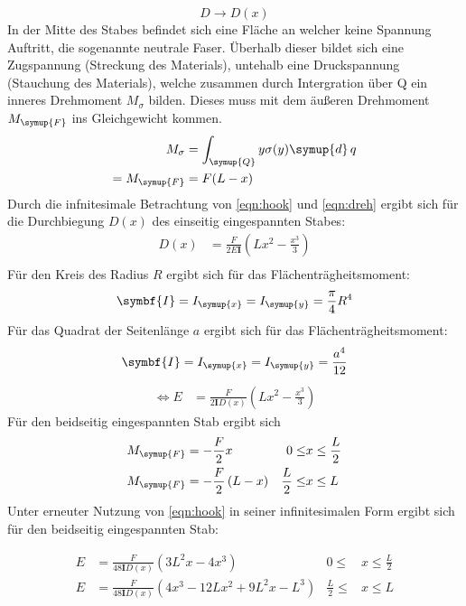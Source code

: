 \begin{equation}
  D \to D(x)
\end{equation}
In der Mitte des Stabes befindet sich eine Fläche an welcher
keine Spannung Auftritt, die sogenannte neutrale Faser. Überhalb dieser
bildet sich eine Zugspannung (Streckung des Materials), untehalb eine Druckspannung
(Stauchung des Materials), welche zusammen durch Intergration über Q ein inneres Drehmoment $M_\sigma$ bilden.
Dieses muss mit dem äußeren Drehmoment $M_\symup{F}$ ins Gleichgewicht kommen.
\begin{equation}
  \begin{split}
    \label{eqn:dreh}
    M_\sigma &= \int_\symup{Q} y \sigma(y) \symup{d} \, q\\
    =M_\symup{F} &= F(L-x)
  \end{split}
\end{equation}
Durch die infnitesimale Betrachtung von \eqref{eqn:hook} und \eqref{eqn:dreh} ergibt
sich für die Durchbiegung $D(x)$ des einseitig eingespannten Stabes:
\begin{align}
  D(x) &= \frac{F}{2E\symbf{I}}\left(Lx^2-\frac{x^3}{3}\right)\\
\end{align}
Für den Kreis des Radius $R$ ergibt sich für das Flächenträgheitsmoment:
\begin{equation}
  \symbf{I}=I_\symup{x}=I_\symup{y}=\frac{\pi}{4}R^4
  \label{eqn:Ikreis}
\end{equation}
Für das Quadrat der Seitenlänge $a$ ergibt sich für das Flächenträgheitsmoment:
\begin{equation}
  \symbf{I}=I_\symup{x}=I_\symup{y}=\frac{a^4}{12}
  \label{eqn:Iquadrat}
\end{equation}
\begin{align}
\iff E &= \frac{F}{2\symbf{I}D(x)}\left(Lx^2-\frac{x^3}{3}\right)
\label{eqn:einseitig}
\end{align}
Für den beidseitig eingespannten Stab ergibt sich
\begin{align}
  M_\symup{F} &= -\frac{F}{2}x & 0 \leq &x \leq \frac{L}{2}\\
  M_\symup{F} &= -\frac{F}{2}\left(L-x\right) & \frac{L}{2} \leq &x \leq L\\
\end{align}
Unter erneuter Nutzung von \eqref{eqn:hook} in seiner infinitesimalen Form
ergibt sich für den beidseitig eingespannten Stab:

\begin{align}
  E &= \frac{F}{48\symbf{I}D(x)}\left(3L^2x-4x^3\right)& 0 \leq &x \leq \frac{L}{2}
  \label{eqn:beidseitigl}\\
  E &= \frac{F}{48\symbf{I}D(x)}\left(4x^3-12Lx^2+9L^2x-L^3\right) & \frac{L}{2} \leq &x \leq L
  \label{eqn:beidseitigr}
\end{align}

